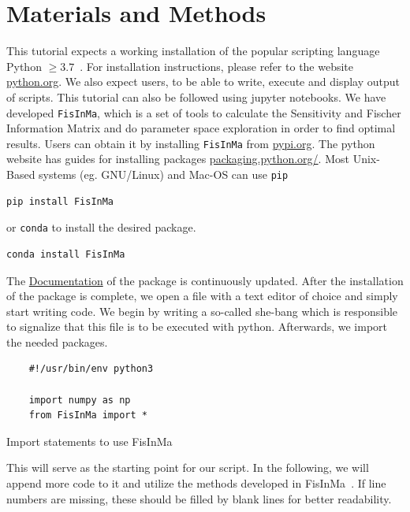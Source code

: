 \documentclass[10pt,A4paper]{article}
\begin{document}
\section*{Materials and Methods}
This tutorial expects a working installation of the popular scripting language Python $\geq3.7$~\cite{rossumPythonLanguageReference2010}.
For installation instructions, please refer to the website \href{https://www.python.org/downloads/}{python.org}.
We also expect users, to be able to write, execute and display output of scripts.
This tutorial can also be followed using jupyter notebooks.
We have developed \texttt{FisInMa}, which is a set of tools to calculate the Sensitivity and Fischer Information Matrix and do parameter space exploration in order to find optimal results.
Users can obtain it by installing \texttt{FisInMa} from \href{https://pypi.org/project/FisInMa/0.0.1/}{pypi.org}.
The python website has guides for installing packages \href{https://packaging.python.org/en/latest/tutorials/installing-packages/}{packaging.python.org/}.
Most Unix-Based systems (eg. GNU/Linux) and Mac-OS can use \texttt{pip}
\begin{verbatim}
pip install FisInMa
\end{verbatim}
or \texttt{conda} to install the desired package.
\begin{verbatim}
conda install FisInMa
\end{verbatim}
The \href{https://spatial-systems-biology-freiburg.github.io/FisInMa/}{Documentation} of the package is continuously updated.
After the installation of the package is complete, we open a file with a text editor of choice and simply start writing code.
We begin by writing a so-called she-bang which is responsible to signalize that this file is to be executed with python.
Afterwards, we import the needed packages.
\begin{code}[h]
    \begin{verbatim}
    #!/usr/bin/env python3

    import numpy as np
    from FisInMa import *
    \end{verbatim}
    \caption{Import statements to use FisInMa}
    \label{code:import_statements}
\end{code}
This will serve as the starting point for our script.
In the following, we will append more code to it and utilize the methods developed in FisInMa~\cite{}.%
If line numbers are missing, these should be filled by blank lines for better readability.
%
%
\end{document}
